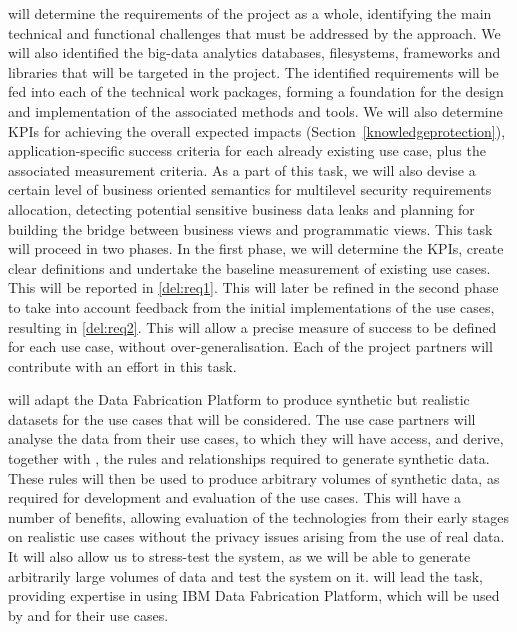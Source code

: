 \begin{Workpackage}{\thewpno}
\begin{Task}
\TaskResults{%
\ref{del:req1},
\ref{del:req2}
}
\TaskHeader{}
\theTask{} will determine the requirements of the \TheProject{} project as a whole, identifying the main technical and functional challenges that must be addressed by the \TheProject{} approach. We will also identified the big-data analytics databases, filesystems, frameworks and libraries that will be targeted in the project. The identified  requirements will be fed into each of the technical work packages, forming a foundation for the design and implementation of the associated methods and tools. We will also determine KPIs for achieving the overall expected impacts (Section~\ref{knowledgeprotection}), application-specific success criteria for each already existing use case, plus the associated measurement criteria. As a part of this task, we will also devise a certain level of business oriented semantics for multilevel security requirements allocation, detecting potential sensitive business data leaks and planning for building the bridge between business views and programmatic views. This task will proceed in two phases. In the first phase, we will determine the KPIs, create clear definitions and undertake the baseline measurement of existing use cases. This will be reported in \ref{del:req1}. This will later be refined in the second phase to take into account feedback from the initial implementations of the use cases, resulting in \ref{del:req2}. This will allow a precise measure of success to be defined for each use case, without over-generalisation. Each of the project partners will contribute with an effort in this task.
\end{Task}

\begin{Task}
\TaskResults{%
\ref{del:eval1},
\ref{del:eval2},
\ref{del:eval3}
}
\TaskHeader{}
\theTask{} will adapt the \IBMshort{} Data Fabrication Platform to produce synthetic but realistic datasets for the use cases that will be considered. The use case partners will analyse the data from their use cases, to which they will have access, and derive, together with \IBMshort{}, the rules and relationships required to generate synthetic data. These rules will then be used to produce arbitrary volumes of synthetic data, as required for development and evaluation of the use cases. This will have a number of benefits, allowing evaluation of the \TheProject{} technologies from their early stages on realistic use cases without the privacy issues arising from the use of real data. It will also allow us to stress-test the system, as we will be able to generate arbitrarily large volumes of data and test the system on it. \IBMshort{} will lead the task, providing expertise in using IBM Data Fabrication Platform, which will be used by \FRQshort{} and \SOPRAshort{} for their use cases.
\end{Task}


\end{Workpackage}
